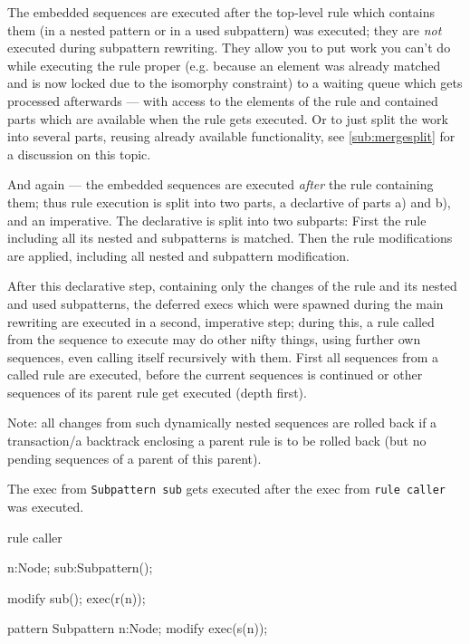 \begin{note}
The embedded sequences are executed after the top-level rule which contains them (in a nested pattern or in a used subpattern) was executed; they are \emph{not} executed during subpattern rewriting.
They allow you to put work you can't do while executing the rule proper (e.g. because an element was already matched and is now locked due to the isomorphy constraint) to a waiting queue which gets processed afterwards --- with access to the elements of the rule and contained parts which are available when the rule gets executed.
Or to just split the work into several parts, reusing already available functionality, see \ref{sub:mergesplit} for a discussion on this topic.
\end{note}

\begin{warning}
And again --- the embedded sequences are executed \emph{after} the rule containing them;
thus rule execution is split into two parts, a declartive of parts a) and b), and an imperative.
The declarative is split into two subparts:
First the rule including all its nested and subpatterns is matched.
Then the rule modifications are applied, including all nested and subpattern modification.

After this declarative step, containing only the changes of the rule and its nested and used subpatterns,
the deferred execs which were spawned during the main rewriting are executed in a second, imperative step;
during this, a rule called from the sequence to execute may do other nifty things,
using further own sequences, even calling itself recursively with them.
First all sequences from a called rule are executed, before the current sequences is continued or other sequences of its parent rule get executed (depth first).

Note: all changes from such dynamically nested sequences are rolled back if a transaction/a backtrack enclosing a parent rule is to be rolled back (but no pending sequences of a parent of this parent).
\end{warning}

\begin{example}
	The exec from \texttt{Subpattern sub} gets executed after the exec from \texttt{rule caller} was executed.
	\begin{grgen}
rule caller
{
  n:Node;
  sub:Subpattern();

  modify {
    sub();
    exec(r(n));
  }
}
pattern Subpattern
{
  n:Node;
  modify {
    exec(s(n));
  }
}
	\end{grgen}
\end{example}

